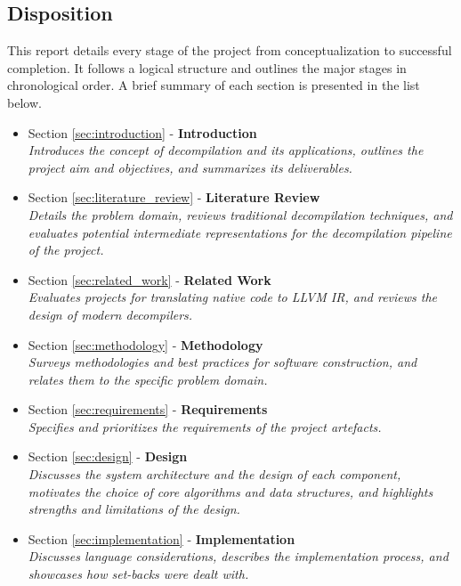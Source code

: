 
\subsection{Disposition}

This report details every stage of the project from conceptualization to successful completion. It follows a logical structure and outlines the major stages in chronological order. A brief summary of each section is presented in the list below.

\begin{itemize}
	\item Section \ref{sec:introduction} - \textbf{Introduction} \\ \textit{Introduces the concept of decompilation and its applications, outlines the project aim and objectives, and summarizes its deliverables.}
	\item Section \ref{sec:literature_review} - \textbf{Literature Review} \\ \textit{Details the problem domain, reviews traditional decompilation techniques, and evaluates potential intermediate representations for the decompilation pipeline of the project.}
	\item Section \ref{sec:related_work} - \textbf{Related Work} \\ \textit{Evaluates projects for translating native code to LLVM IR, and reviews the design of modern decompilers.}
	\item Section \ref{sec:methodology} - \textbf{Methodology} \\ \textit{Surveys methodologies and best practices for software construction, and relates them to the specific problem domain.}
	\item Section \ref{sec:requirements} - \textbf{Requirements} \\ \textit{Specifies and prioritizes the requirements of the project artefacts.}
	\item Section \ref{sec:design} - \textbf{Design} \\ \textit{Discusses the system architecture and the design of each component, motivates the choice of core algorithms and data structures, and highlights strengths and limitations of the design.}
	\item Section \ref{sec:implementation} - \textbf{Implementation} \\ \textit{Discusses language considerations, describes the implementation process, and showcases how set-backs were dealt with.}

\end{itemize}
